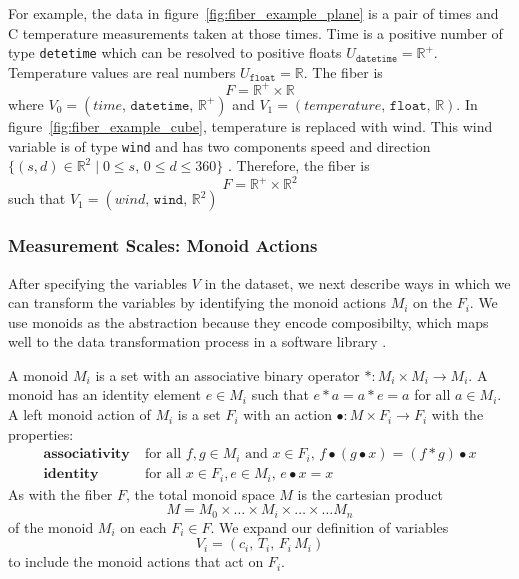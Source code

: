 \documentclass[../main.tex]{subfiles}
\begin{document}
For example, the data in figure~\ref{fig:fiber_example_plane} is a pair of times and \textdegree C temperature measurements taken at those times. Time is a positive number of type \texttt{detetime} which can be resolved to positive floats $U_{\texttt{datetime}}= \mathbb{R}^+$. Temperature values are real numbers $U_{\texttt{float}} = \mathbb{R}$. The fiber is 
\begin{equation}
    F =  \mathbb{R}^{+} \times \mathbb{R} 
\end{equation} 
where $V_0 = (time,\, \texttt{datetime},\, \mathbb{R}^+)$ and $V_1 = (temperature,\, \texttt{float},\, \mathbb{R})$. In figure~\ref{fig:fiber_example_cube}, temperature is replaced with wind. This wind variable is of type \texttt{wind} and has two components speed and direction $\{(s,d) \in \mathbb{R}^{2} \mid  0\leq s,\, 0 \leq d \leq 360\}$ . Therefore, the fiber is 
\begin{equation}
    F = \mathbb{R}^{+} \times \mathbb{R}^2
\end{equation} 
such that $V_1 = (wind,\, \texttt{wind},\, \mathbb{R}^{2})$  

\subsubsection{Measurement Scales: Monoid Actions}
\label{sec:data_monoid}
After specifying the variables $V$ in the dataset, we next describe ways in which we can transform the variables by identifying the monoid actions $M_i$ on the $F_i$. We use monoids as the abstraction because they encode composibilty, which maps well to the data transformation process in a software library \cite{yorgeyMonoidsThemeVariations}. 

A monoid \cite{Monoid2021} $M_i$ is a set with an associative binary operator $\ast:M_i \times M_i\rightarrow M_i$. A monoid has an identity element $e\in M_i$ such that $e\ast a= a \ast e = a$ for all $a \in M_i$. A left monoid action \cite{SemigroupAction2021,ActionNLab} of $M_i$ is a set $F_i$ with an action $\bullet: M\times F_i \rightarrow F_i$ with the properties:
\begin{align*}
    \textbf{associativity}\;& \text{for all } f,g \in M_i \text{ and } x\in F_i,\, f\bullet(g\bullet x) = (f\ast g) \bullet x\\
    \textbf{identity}\;& \text{for all } x\in F_i, e\in M_i,\,  e\bullet x = x 
\end{align*}
As with the fiber $F$, the total monoid space $M$ is the cartesian product
\begin{equation}
M = M_{0} \times \ldots \times M_{i}\times \ldots \times\ldots M_{n}
\end{equation}
of the monoid $M_{i}$ on each $F_{i}\in F$. We expand our definition of variables 
\begin{equation}
        V_i = (c_i,\, T_i,\, F_i\, M_i)
\end{equation}
to include the monoid actions that act on $F_i$. 
\end{document}
